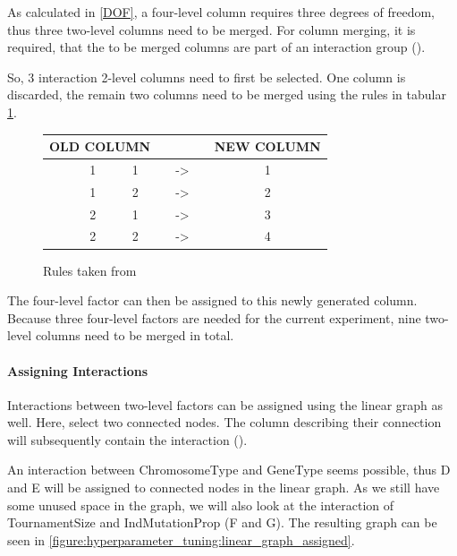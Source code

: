 As calculated in \ref{DOF}, a four-level column requires three degrees of freedom, thus three two-level columns need to be merged. For column merging, it is required, that the to be merged columns are part of an interaction group (\cite{yang_design_2009}).

So, 3 interaction 2-level columns need to first be selected. One column is discarded, the remain two columns need to be merged using the rules in tabular \ref{table:hyperparameter_tuning:merging_rules}.

\begin{figure}[ht]
	\centering
	\begin{tabular}{ |ccccccc|  }
		\hline
		\multicolumn{3}{|c}{ OLD COLUMN } & & & & NEW COLUMN \\
		\hline
		& 1 & 1 & & -> & & 1\\
		& 1 & 2 & & -> & & 2\\
		& 2 & 1 & & -> & & 3\\
		& 2 & 2 & & -> & & 4\\
		\hline
	\end{tabular}
	\caption{Rules taken from \cite{roy_primer_1990}}
	\label{table:hyperparameter_tuning:merging_rules}
\end{figure}

The four-level factor can then be assigned to this newly generated column. Because three four-level factors are needed for the current experiment, nine two-level columns need to be merged in total.

\paragraph{Assigning Interactions}
Interactions between two-level factors can be assigned using the linear graph as well. Here, select two connected nodes. The column describing their connection will subsequently contain the interaction (\cite{taguchi_taguchis_2005}).

An interaction between ChromosomeType and GeneType seems possible, thus D and E will be assigned to connected nodes in the linear graph. As we still have some unused space in the graph, we will also look at the interaction of TournamentSize and IndMutationProp (F and G). The resulting graph can be seen in \ref{figure:hyperparameter_tuning:linear_graph_assigned}.


